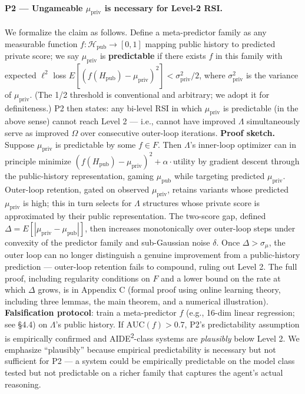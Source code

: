 \documentclass{article}
\theoremstyle{definition}
\begin{document}
\paragraph{P2 --- Ungameable $\mu_{\text{priv}}$ is necessary for Level-2 RSI.}
We formalize the claim as follows. Define a meta-predictor family as any measurable function $f : \mathcal{H}_{\text{pub}} \to [0,1]$ mapping public history to predicted private score; we say $\mu_{\text{priv}}$ is \textbf{predictable} if there exists $f$ in this family with expected $\ell^2$ loss $E[(f(H_{\text{pub}}) - \mu_{\text{priv}})^2] < \sigma^2_{\text{priv}} / 2$, where $\sigma^2_{\text{priv}}$ is the variance of $\mu_{\text{priv}}$. (The 1/2 threshold is conventional and arbitrary; we adopt it for definiteness.) P2 then states: any bi-level RSI in which $\mu_{\text{priv}}$ is predictable (in the above sense) cannot reach Level 2 --- i.e., cannot have improved $\Lambda$ simultaneously serve as improved $\Omega$ over consecutive outer-loop iterations. \textbf{Proof sketch.} Suppose $\mu_{\text{priv}}$ is predictable by some $f \in F$. Then $\Lambda$'s inner-loop optimizer can in principle minimize $(f(H_{\text{pub}}) - \mu_{\text{priv}})^2 + \alpha \cdot \text{utility}$ by gradient descent through the public-history representation, gaming $\mu_{\text{pub}}$ while targeting predicted $\mu_{\text{priv}}$. Outer-loop retention, gated on observed $\mu_{\text{priv}}$, retains variants whose predicted $\mu_{\text{priv}}$ is high; this in turn selects for $\Lambda$ structures whose private score is approximated by their public representation. The two-score gap, defined $\Delta = E[|\mu_{\text{priv}} - \mu_{\text{pub}}|]$, then increases monotonically over outer-loop steps under convexity of the predictor family and sub-Gaussian noise $\delta$. Once $\Delta > \sigma_\mu$, the outer loop can no longer distinguish a genuine improvement from a public-history prediction --- outer-loop retention fails to compound, ruling out Level 2. The full proof, including regularity conditions on $F$ and a lower bound on the rate at which $\Delta$ grows, is in Appendix C (formal proof using online learning theory, including three lemmas, the main theorem, and a numerical illustration). \textbf{Falsification protocol}: train a meta-predictor $f$ (e.g., 16-dim linear regression; see \S4.4) on $\Lambda$'s public history. If $\text{AUC}(f) > 0.7$, P2's predictability assumption is empirically confirmed and AIDE\textsuperscript{2}-class systems are \textit{plausibly} below Level 2. We emphasize ``plausibly'' because empirical predictability is necessary but not sufficient for P2 --- a system could be empirically predictable on the model class tested but not predictable on a richer family that captures the agent's actual reasoning.
\end{document}
